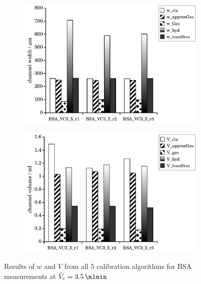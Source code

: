 \begin{figure}[htp]
  \begin{center}
    \begin{subfigure}{\subFigSize}
      \includegraphics[width=\linewidth]{./images/data/img_calibW_BSA_VC_3_5.pdf}
      \label{subfig:calibRes_BSA_VC3_5_w}
    \end{subfigure}
    \begin{subfigure}{\subFigSize}
      \includegraphics[width=\linewidth]{./images/data/img_calibV_BSA_VC_3_5.pdf}
    \end{subfigure}
  \end{center}
  \vspace*{-4ex}    
  \caption[Results of $w$ and $V$ from all 5 calibration algorithms for BSA measurements at
  $\Vc = \SI{3.5}{\mlmin}$]{
    Results of $w$ and $V$ from all 5 calibration algorithms for BSA measurements at
    $\Vc = \SI{3.5}{\mlmin}$
  }
  \label{fig:calibRes_BSA_VC3_5}
\end{figure}

